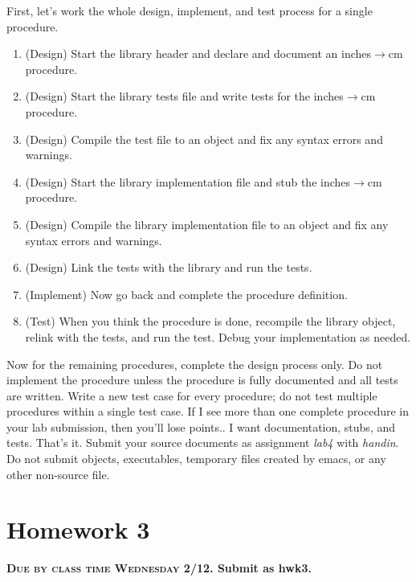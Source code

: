 \documentclass[]{tufte-handout}
\begin{document}
First, let's work the whole design, implement, and test process for a single procedure.
\begin{enumerate}
\item (Design) Start the library header and declare and document an inches$\rightarrow$cm procedure.
\item (Design) Start the library tests file and write tests for the inches$\rightarrow$cm procedure.
\item (Design) Compile the test file to an object and fix any syntax errors and warnings.
\item (Design) Start the library implementation file and stub the inches$\rightarrow$cm procedure.
\item (Design) Compile the library implementation file to an object and fix any syntax errors and warnings.
\item (Design) Link the tests with the library and run the tests. 
\item (Implement) Now go back and complete the procedure definition.
\item (Test) When you think the procedure is done, recompile the library object, relink with the tests, and run the test. Debug your implementation as needed.
\end{enumerate}

Now for the remaining procedures, complete the design process only. Do not implement the procedure unless the procedure is fully documented and all tests are written.  Write a new test case for every procedure; do not test multiple procedures within a single test case. If I see more than one complete procedure in your lab submission, then you'll lose points.. I want documentation, stubs, and tests. That's it.  Submit your source documents as assignment \textit{lab4} with \textit{handin}.  Do not submit objects, executables, temporary files created by emacs, or any other non-source file. 

\section{Homework 3}

\begin{center}
\textbf{\textsc{Due by class time Wednesday 2/12}. Submit as hwk3.}
\end{center}
\end{document}

